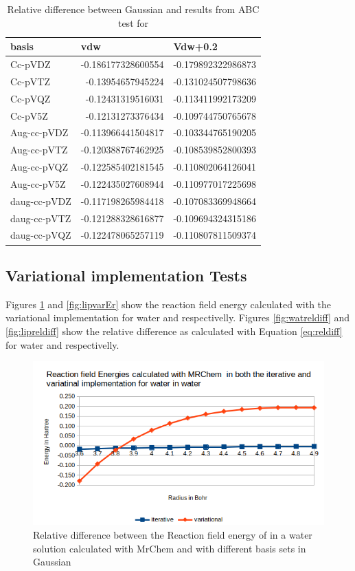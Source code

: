 \documentclass[../master_thesis.tex]{subfiles}
\begin{document}
\begin{table}[htbp]
\caption{Relative difference between Gaussian and \mrchem results from \ac{ABC}  test for }
\begin{tabular}{|l|r|r|}
\hline
basis & \multicolumn{1}{l|}{vdw} & \multicolumn{1}{l|}{Vdw+0.2} \\ \hline
Cc-pVDZ & -0.186177328600554 & -0.179892322986873 \\ \hline
Cc-pVTZ & -0.13954657945224 & -0.131024507798636 \\ \hline
Cc-pVQZ & -0.12431319516031 & -0.113411992173209 \\ \hline
Cc-pV5Z & -0.12131273376434 & -0.109744750765678 \\ \hline
Aug-cc-pVDZ & -0.113966441504817 & -0.103344765190205 \\ \hline
Aug-cc-pVTZ & -0.120388767462925 & -0.108539852800393 \\ \hline
Aug-cc-pVQZ & -0.122585402181545 & -0.110802064126041 \\ \hline
Aug-cc-pV5Z & -0.122435027608944 & -0.110977017225698 \\ \hline
daug-cc-pVDZ & -0.117198265984418 & -0.107083369948664 \\ \hline
daug-cc-pVTZ & -0.121288328616877 & -0.109694324315186 \\ \hline
daug-cc-pVQZ & -0.122478065257119 & -0.110807811509374 \\ \hline
\end{tabular}
\label{tab:acetamidabcreldiff}
\end{table}



\subsection{Variational implementation Tests}
Figures \ref{fig:watvarEr} and \ref{fig:lipvarEr} show the reaction field energy
calculated with the variational implementation for water and 
respectivelly. Figures \ref{fig:watreldiff} and \ref{fig:lipreldiff} show the
relative difference as calculated with Equation \ref{eq:reldiff} for water and 
respectivelly.

\begin{figure}[h!]
  \centering
  \includegraphics[width=0.75\linewidth]{img/watvarEr.png}
  \caption{Relative difference between the Reaction field energy of  in a water solution calculated with MrChem
  and with different basis sets in Gaussian}
  \label{fig:watvarEr}
\end{figure}
\end{document}
